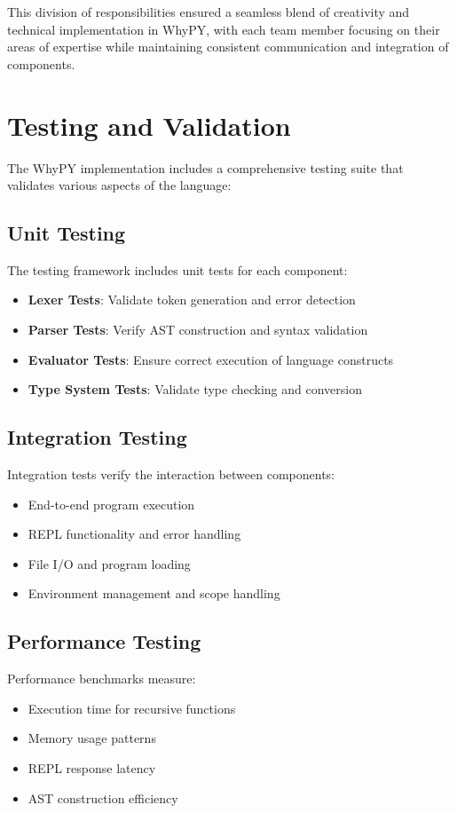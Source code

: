 \documentclass[conference]{IEEEtran}
\begin{document}
This division of responsibilities ensured a seamless blend of creativity and technical implementation in WhyPY, with each team member focusing on their areas of expertise while maintaining consistent communication and integration of components.

\section{Testing and Validation}

The WhyPY implementation includes a comprehensive testing suite that validates various aspects of the language:

\subsection{Unit Testing}
The testing framework includes unit tests for each component:
\begin{itemize}
    \item \textbf{Lexer Tests}: Validate token generation and error detection
    \item \textbf{Parser Tests}: Verify AST construction and syntax validation
    \item \textbf{Evaluator Tests}: Ensure correct execution of language constructs
    \item \textbf{Type System Tests}: Validate type checking and conversion
\end{itemize}

\subsection{Integration Testing}
Integration tests verify the interaction between components:
\begin{itemize}
    \item End-to-end program execution
    \item REPL functionality and error handling
    \item File I/O and program loading
    \item Environment management and scope handling
\end{itemize}

\subsection{Performance Testing}
Performance benchmarks measure:
\begin{itemize}
    \item Execution time for recursive functions
    \item Memory usage patterns
    \item REPL response latency
    \item AST construction efficiency
\end{itemize}
\end{document}
